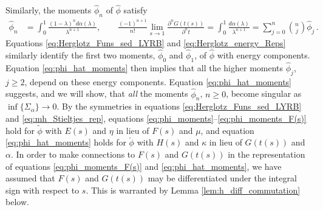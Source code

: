 \documentclass[english,12pt,jmp,graphicx]{revtex4-1}
\newcommand{\ph}{\hat{\phi}}
\begin{document}
Similarly, the moments $\ph_n$ of $\ph$ satisfy
%
\begin{align}\label{eq:phi_hat_moments}
  \ph_n%
      &=\int_0^1\frac{(1-\lambda)^nd\alpha(\lambda)}{\lambda^{n+1}}, \qquad
      \frac{(-1)^{n+1}}{n!}\lim_{s\to1}\frac{\partial^nG(t(s))}{\partial^nt}
         =\int_0^1\frac{d\alpha(\lambda)}{\lambda^{n+1}}
          =\sum_{j=0}^n{n \choose j} \ph_j\,.
\end{align}
%
Equations \eqref{eq:Herglotz_Funs_sed_LYRB} and
\eqref{eq:Herglotz_energy_Reps} similarly identify the first
two moments, $\ph_0$ and $\ph_1$, of $\ph$ with energy
components. Equation \eqref{eq:phi_hat_moments} then implies that all
the higher moments $\ph_j$, $j\geq2$, depend on these energy
components. Equation 
\eqref{eq:phi_hat_moments} suggests, and we will show, that \emph{all}
the moments $\ph_n$, $n\geq0$, become singular as $\inf\{\Sigma_\alpha\}\to0$. By the
symmetries in equations \eqref{eq:Herglotz_Funs_sed_LYRB} and
\eqref{eq:mh_Stieltjes_rep}, equations 
\eqref{eq:phi_moments}--\eqref{eq:phi_moments_F(s)} hold for
$\tilde{\phi}$ with $E(s)$ and $\eta$ in lieu of $F(s)$ and $\mu$, and equation
\eqref{eq:phi_hat_moments} holds for $\check{\phi}$ with $H(s)$ and $\kappa$ in lieu
of $G(t(s))$ and $\alpha$. In order to make connections to $F(s)$ and $G(t(s))$ in the
representation of equations \eqref{eq:phi_moments_F(s)} and
\eqref{eq:phi_hat_moments}, we have assumed that $F(s)$ and $G(t(s))$ may
be differentiated under the integral sign with respect to $s$. This
is warranted by Lemma \ref{lem:h_diff_commutation} below.
\end{document}
